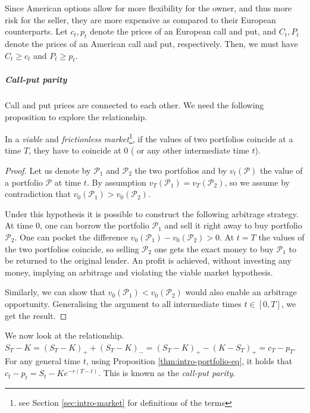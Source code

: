 Since American options allow for more flexibility for the owner, and thus more risk for the seller, they are more expensive as compared to their European counterparts. Let $ c_t, p_t $ denote the prices of an European call and put, and $ C_t, P_t $ denote the prices of an American call and put, respectively. Then, we must have $ C_t \ge c_t $ and $ P_t \ge p_t $.


\subparagraph{Call-put parity}  Call and put prices are connected to each other. We need the following proposition to explore the relationship.

\begin{prp}
	\label{thm:intro-portfolio-eq}
	In a \emph{viable} and \emph{frictionless market}\footnote{see Section \ref{sec:intro-market} for definitions of the terms}, if the values of two portfolios coincide at a time $ T $, they have to coincide at $ 0 $ ( or any other intermediate time $ t $).
\end{prp}

\begin{proof}
	Let us denote by $ \mathcal{P}_1 $ and $ \mathcal{P}_2 $ the two portfolios and by $ v_t(\mathcal{P}) $ the value of a portfolio $ \mathcal{P} $ at time $ t $. By assumption $ v_T (\mathcal{P}_1) = v_T (\mathcal{P}_2) $, so we assume by contradiction that $ v_0 (\mathcal{P}_1) > v_0 (\mathcal{P}_2) $.
	
	Under this hypothesis it is possible to construct the following arbitrage strategy. At time 0, one can borrow the portfolio $ \mathcal{P}_1 $ and sell it right away to buy portfolio $ \mathcal{P}_2 $. One can pocket the difference $ v_0 (\mathcal{P}_1) - v_0 (\mathcal{P}_2) > 0 $. At $ t = T $ the values of the two portfolios coincide, so selling $ \mathcal{P}_2 $ one gets the exact money to buy $ \mathcal{P}_1 $ to be returned to the original lender. An profit is achieved, without investing any money, implying an arbitrage and violating the viable market hypothesis.
	
	Similarly, we can show that $ v_0 (\mathcal{P}_1) < v_0 (\mathcal{P}_2) $ would also enable an arbitrage opportunity. Generalising the argument to all intermediate times $ t \in [0, T] $, we get the result.
\end{proof}

We now look at the relationship. $ S_T - K = (S_T - K)_+ + (S_T - K)_- = (S_T - K)_+ - (K - S_T)_+ = c_T - p_T $. For any general time $ t $, using Proposition \ref{thm:intro-portfolio-eq}, it holds that $ c_t - p_t = S_t - K e^{- r (T-t) } $. This is known as the \emph{call-put parity}.


